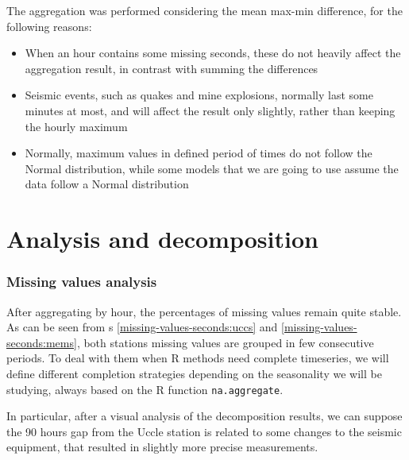 \documentclass[12pt]{article}
\begin{document}
The aggregation was performed considering the mean max-min difference, for the following reasons:
\begin{itemize}[topsep=0.5em,itemsep=0em,partopsep=0.5em]
	\item When an hour contains some missing seconds, these do not heavily affect the aggregation result, in contrast with summing the differences
	\item Seismic events, such as quakes and mine explosions, normally last some minutes at most, and will affect the result only slightly, rather than keeping the hourly maximum
	\item Normally, maximum values in defined period of times do not follow the Normal distribution, while some models that we are going to use assume the data follow a Normal distribution
\end{itemize}

\section{Analysis and decomposition}
\subsubsection{Missing values analysis}



After aggregating by hour, the percentages of missing values remain quite stable. As can be seen from \figurename{s} \ref{missing-values-seconds:uccs} and \ref{missing-values-seconds:mems}, both stations missing values are grouped in few consecutive periods.
To deal with them when R methods need complete timeseries, we will define different completion strategies depending on the seasonality we will be studying, always based on the R function \texttt{na.aggregate}.

In particular, after a visual analysis of the decomposition results, we can suppose the 90 hours gap from the Uccle station is related to some changes to the seismic equipment, that resulted in slightly more precise measurements.
\end{document}
